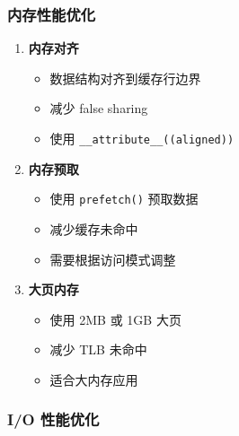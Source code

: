 \subsubsection{内存性能优化}

\begin{enumerate}
  \item \textbf{内存对齐}
    \begin{itemize}
      \item 数据结构对齐到缓存行边界
      \item 减少 false sharing
      \item 使用 \texttt{\_\_attribute\_\_((aligned))}
    \end{itemize}

  \item \textbf{内存预取}
    \begin{itemize}
      \item 使用 \texttt{prefetch()} 预取数据
      \item 减少缓存未命中
      \item 需要根据访问模式调整
    \end{itemize}

  \item \textbf{大页内存}
    \begin{itemize}
      \item 使用 2MB 或 1GB 大页
      \item 减少 TLB 未命中
      \item 适合大内存应用
    \end{itemize}
\end{enumerate}

\subsubsection{I/O 性能优化}

